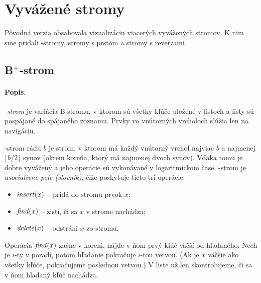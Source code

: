 \section{Vyvážené stromy}

Pôvodná verzia \citep{kuko} obsahovala vizualizáciu viacerých vyvážených stromov.
K nim sme pridali \Bp-stromy, stromy s prstom a stromy s reverzami.

\subsection{B$\!^+\!$-strom}

\paragraph{Popis.}
\emph{\Bp-strom} je variácia B-stromu, v ktorom sú všetky kľúče uložené v listoch
a listy sú pospájané do spájaného zoznamu. Prvky vo vnútorných vrcholoch slúžia len
na navigáciu. 

\Bp-strom rádu $b$ je strom, v ktorom má každý vnútorný vrchol najviac $b$
a najmenej $\lfloor b/2 \rfloor$ synov (okrem koreňa, ktorý má najmenej dvoch synov).
Vďaka tomu je dobre vyvážený a jeho operácie sú vykonávané v logaritmickom čase.
\Bp-strom je \emph{asociatívne pole (slovník)}, čiže poskytuje tieto tri operácie:
\begin{itemize}
\item $\mathop{\mathit{insert}}(x)$ -- pridá do stromu prvok $x$;
\item $\mathop{\mathit{find}}(x)$ -- zistí, či sa $x$ v strome nachádza;
\item $\mathop{\mathit{delete}}(x)$ -- odstráni $x$ zo stromu.
\end{itemize}

Operácia $\mathop{\mathit{find}}(x)$ začne v koreni, nájde v ňom prvý kľúč väčší od hľadaného.
Nech je $i$-ty v poradí, potom hľadanie pokračuje $i$-tou vetvou.
(Ak je $x$ väčšie ako všetky kľúče, pokračujeme poslednou vetvou.)
V liste už len skontrolujeme, či sa v ňom hľadaný kľúč nachádza.


